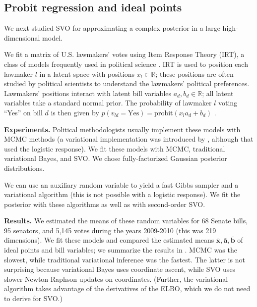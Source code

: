 \subsection{Probit regression and ideal points}
\label{sec:probit_regression}
We next studied SVO for approximating a complex posterior in a large
high-dimensional model.

We fit a matrix of U.S. lawmakers' votes using Item Response Theory
(IRT), a class of models frequently used in political science
\citep{poole:1991,martin:2002,albert:1992}.  IRT is used to position
each lawmaker $l$ in a latent space with positions $x_l \in
\mathbb{R}$; these positions are often studied by political scientists
to understand the lawmakers' political preferences.  Lawmakers'
positions interact with latent bill variables $a_d, b_d \in
\mathbb{R}$; all latent variables take a standard normal prior.  The
probability of lawmaker $l$ voting ``Yes'' on bill $d$ is then given
by $p(v_{ld} = \mbox{Yes}) = \mbox{probit}(x_l a_d + b_d)$
\citep{clinton:2004}.

\textbf{Experiments.}  Political methodologists usually implement
these models with MCMC methods \citep{albert:1992} (a variational
implementation was introduced by \cite{gerrish:2011}, although that
used the logistic response). We fit these models with MCMC,
traditional variational Bayes, and SVO.  We chose fully-factorized
Gaussian posterior distributions.

We can use an auxiliary random variable to yield a fast Gibbs sampler
and a variational algorithm \citep{armagan:2011} (this is not possible
with a logistic response).  We fit the posterior with these algorithms
as well as with second-order SVO.

\textbf{Results.} We estimated the means of these random variables for
68 Senate bills, 95 senators, and 5,145 votes during the years
2009-2010 (this was 219 dimensions).  We fit these models and compared
the estimated means $\bm \bar x, \bm \bar a, \bm \bar b$ of ideal
points and bill variables; we summarize the results in
.  MCMC was the slowest, while traditional
variational inference was the fastest.  The latter is not surprising
because variational Bayes uses coordinate ascent, while SVO uses
slower Newton-Raphson updates on coordinates.  (Further, the
variational algorithm takes advantage of the derivatives of the ELBO,
which we do not need to derive for SVO.)

